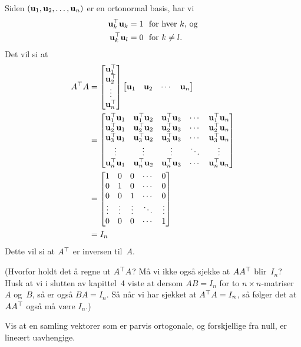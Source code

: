 \begin{losning}
Siden $(\mathbf{u}_1, \mathbf{u}_2, \ldots, \mathbf{u}_n)$ er en ortonormal basis,
har vi
\begin{align*}
\mathbf{u}_k^\top \mathbf{u}_k &= 1
\ \ \text{for hver $k$, og} \\
\mathbf{u}_k^\top \mathbf{u}_l &= 0
\ \ \text{for $k \ne l$.}
\end{align*}
Det vil si at
\begin{align*}
A^\top A
&=
\begin{bmatrix}
\mathbf{u}_1^\top \\ \mathbf{u}_2^\top \\ \vdots \\ \mathbf{u}_n^\top
\end{bmatrix}
\begin{bmatrix}
\mathbf{u}_1 & \mathbf{u}_2 & \cdots & \mathbf{u}_n
\end{bmatrix}
\\
&=
\begin{bmatrix}
\mathbf{u}_1^\top \mathbf{u}_1 & \mathbf{u}_1^\top \mathbf{u}_2 & \mathbf{u}_1^\top \mathbf{u}_3 & \cdots & \mathbf{u}_1^\top \mathbf{u}_n \\
\mathbf{u}_2^\top \mathbf{u}_1 & \mathbf{u}_2^\top \mathbf{u}_2 & \mathbf{u}_2^\top \mathbf{u}_3 & \cdots & \mathbf{u}_2^\top \mathbf{u}_n \\
\mathbf{u}_3^\top \mathbf{u}_1 & \mathbf{u}_3^\top \mathbf{u}_2 & \mathbf{u}_3^\top \mathbf{u}_3 & \cdots & \mathbf{u}_3^\top \mathbf{u}_n \\
\vdots       & \vdots       & \vdots       & \ddots & \vdots       \\
\mathbf{u}_n^\top \mathbf{u}_1 & \mathbf{u}_n^\top \mathbf{u}_2 & \mathbf{u}_n^\top \mathbf{u}_3 & \cdots & \mathbf{u}_n^\top \mathbf{u}_n
\end{bmatrix}
\\
&=
\begin{bmatrix}
1 & 0 & 0 & \cdots & 0 \\
0 & 1 & 0 & \cdots & 0 \\
0 & 0 & 1 & \cdots & 0 \\
\vdots & \vdots & \vdots & \ddots & \vdots \\
0 & 0 & 0 & \cdots & 1
\end{bmatrix}
\\
&= I_n
\end{align*}
Dette vil si at $A^\top$ er inversen til~$A$.

(Hvorfor holdt det å regne ut $A^\top A$?  Må vi ikke også sjekke at
$A A^\top$ blir~$I_n$?  Husk at vi i slutten av kapittel~4 viste at
dersom $AB = I_n$ for to $n \times n$-matriser $A$ og~$B$, så er også
$BA = I_n$.  Så når vi har sjekket at $A^\top A = I_n$, så følger det at
$A A^\top$ også må være $I_n$.)
\end{losning}


\begin{oppgave}
Vis at en samling vektorer som er parvis ortogonale, og forskjellige fra null, er lineært uavhengige.
\end{oppgave}


